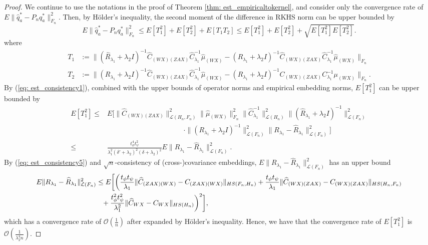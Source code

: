 \begin{proof}
    We continue to use the notations in the proof of Theorem \ref{thm: est_empiricaltokernel},  
    and consider only the convergence rate of $E\|\widehat{q}^*_a-P_nq^*_a\|^2_{F_n}$. 
    Then, by H\"{o}lder's inequality, the second moment of the difference in RKHS norm can be upper bounded by 
    \begin{equation}
        \label{eq: est_secondconvergencerate}
        E\|\widehat{q}_a^*-P_nq_a^*\|^2_{F_n} \leq E[T_1^2] + E[T_2^2] + E[T_1T_2] \leq E[T_1^2] + E[T_2^2] + \sqrt{E[T_1^2]E[T_2^2]}. 
    \end{equation}
    where 
    \begin{align*}
        T_1&:=\|(\widehat{R}_{\lambda_1}+\lambda_2I)^{-1}\widehat{C}_{(WX)(ZAX)}\widehat{C}^{-1}_{\lambda_1}\widehat{\mu}_{(WX)}-(R_{\lambda_1}+\lambda_2I)^{-1}\widehat{C}_{(WX)(ZAX)}\widehat{C}^{-1}_{\lambda_1}\widehat{\mu}_{(WX)}\|_{F_n} \\
        T_2&:=\|(R_{\lambda_1}+\lambda_2I)^{-1}\widehat{C}_{(WX)(ZAX)}\widehat{C}^{-1}_{\lambda_1}\widehat{\mu}_{(WX)}-(R_{\lambda_1}+\lambda_2I)^{-1}C_{(WX)(ZAX)}C^{-1}_{\lambda_1}\mu_{(WX)}\|_{F_n}.  
    \end{align*}
    By (\ref{eq: est_consistency1}), combined with the upper bounds of operator norms and empirical embedding norms, 
    $E[T_1^2]$ can be upper bounded by 
    \begin{align*}
        E[T_1^2] \leq& E\bigg[\|\widehat{C}_{(WX)(ZAX)}\|^2_{\mathcal{L}(H_n,F_n)}\|\widehat{\mu}_{(WX)}\|^2_{F_n} \|\widehat{C}^{-1}_{\lambda_1}\|^2_{\mathcal{L}(H_n)}\|(\widehat{R}_{\lambda_1}+\lambda_2I)^{-1}\|^2_{\mathcal{L}(F_n)} \\
                     &\phantom{\|\widehat{C}_{(WX)(ZAX)}\|^2_{\mathcal{L}(H_n)}} \cdot \|(R_{\lambda_1}+\lambda_2I)^{-1}\|^2_{\mathcal{L}(F_n)} \|R_{\lambda_1}-\widehat{R}_{\lambda_1}\|^2_{\mathcal{L}(F_n)}\bigg] \\
                 \leq& \frac{t^4_{\phi}t^2_{\psi}}{\lambda^2_1(\delta'+\lambda_2)^2(\delta+\lambda_2)^2}E\|R_{\lambda_1}-\widehat{R}_{\lambda_1}\|^2_{\mathcal{L}(F_n)}.  
    \end{align*}
    By (\ref{eq: est_consistency5}) and $\sqrt{n}$-consistency of (cross-)covariance embeddings, 
    $E\|R_{\lambda_1}-\widehat{R}_{\lambda_1}\|^2_{\mathcal{L}(F_n)}$ has an upper bound 
    \begin{align*}
        E\|R_{\lambda_1}-\widehat{R}_{\lambda_1}\|^2_{\mathcal{L}(F_n)} &\leq E\bigg[\bigg(\frac{t_{\phi}t_{\psi}}{\lambda_1}\|\widehat{C}_{(ZAX)(WX)}-C_{(ZAX)(WX)}\|_{HS(F_n,H_n)} + \frac{t_{\phi}t_{\psi}}{\lambda_1}\|\widehat{C}_{(WX)(ZAX)}-C_{(WX)(ZAX)}\|_{HS(H_n,F_n)} \notag\\
                                                                      &\phantom{\leq}+ \frac{t^2_{\phi}t^2_{\psi}}{\lambda^2_1}\|\widehat{C}_{WX}-C_{WX}\|_{HS(H_n)}\bigg)^2\bigg],  
    \end{align*}
    which has a convergence rate of $\mathcal{O}(\frac{1}{n})$ after expanded by H\"{o}lder's inequality. 
    Hence, we have that the convergence rate of $E[T_1^2]$ is $\mathcal{O}(\frac{1}{\lambda^4_2n})$. 


\end{proof}
